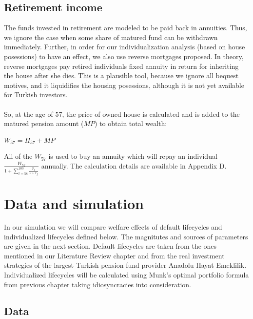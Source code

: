 \documentclass[]{elsarticle}
\begin{document}
\subsection{Retirement income}

The funds invested in retirement are modeled to be paid back in annuities. Thus, we ignore the case when some share of matured fund can be withdrawn immediately. Further, in order for our individualization analysis (based on house posessions) to have an effect, we also use reverse mortgages proposed. In theory, reverse mortgages pay retired individuals fixed annuity in return for inheriting the house after she dies. This is a plausible tool, because we ignore all bequest motives, and it liquidifies the housing posessions, although it is not yet available for Turkish investors. 

\paragraph{}So, at the age of 57, the price of owned house is calculated and is added to the matured pension amount ($MP$) to obtain total wealth:

\begin{center}
	$W_{57} = H_{57} + MP$
\end{center}

All of the $W_{57}$ is used to buy an annuity which will repay an individual $\frac{W_{57}}{1+\sum^{100}_{t=58} \frac{p_t}{1+r_f}}$ annually. The calculation details are available in Appendix D. 

\section{Data and simulation}
\label{data}

In our simulation we will compare welfare effects of default lifecycles and individualized lifecycles defined below. The magnitutes and sources of parameters are given in the next section. Default lifecycles are taken from the ones mentioned in our Literature Review chapter and from the real investment strategies of the largest Turkish pension fund provider Anadolu Hayat Emeklilik. Individualized lifecycles will be calculated using Munk's optimal portfolio formula from previous chapter taking idiosyncracies into consideration.

\subsection{Data}
\end{document}

